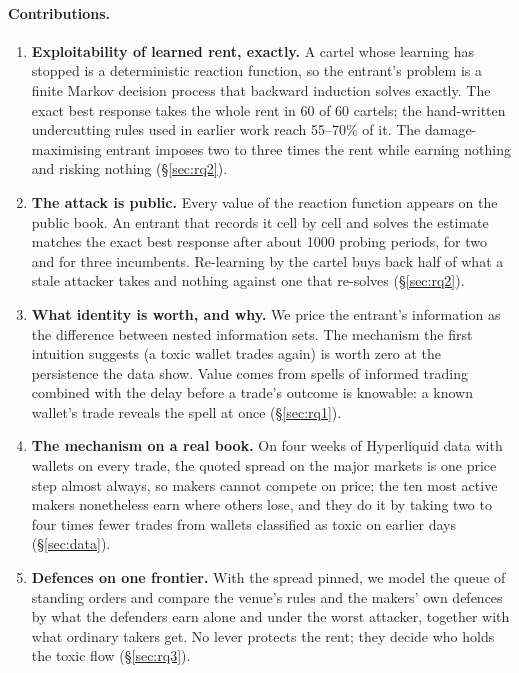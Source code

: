 \documentclass[11pt]{article}
\begin{document}
\paragraph{Contributions.}
\begin{enumerate}
\item \textbf{Exploitability of learned rent, exactly.} A cartel whose learning has stopped is a deterministic reaction function, so the entrant's problem is a finite Markov decision process that backward induction solves exactly. The exact best response takes the whole rent in 60 of 60 cartels; the hand-written undercutting rules used in earlier work reach 55--70\% of it. The damage-maximising entrant imposes two to three times the rent while earning nothing and risking nothing (\S\ref{sec:rq2}).
\item \textbf{The attack is public.} Every value of the reaction function appears on the public book. An entrant that records it cell by cell and solves the estimate matches the exact best response after about 1000 probing periods, for two and for three incumbents. Re-learning by the cartel buys back half of what a stale attacker takes and nothing against one that re-solves (\S\ref{sec:rq2}).
\item \textbf{What identity is worth, and why.} We price the entrant's information as the difference between nested information sets. The mechanism the first intuition suggests (a toxic wallet trades again) is worth zero at the persistence the data show. Value comes from spells of informed trading combined with the delay before a trade's outcome is knowable: a known wallet's trade reveals the spell at once (\S\ref{sec:rq1}).
\item \textbf{The mechanism on a real book.} On four weeks of Hyperliquid data with wallets on every trade, the quoted spread on the major markets is one price step almost always, so makers cannot compete on price; the ten most active makers nonetheless earn where others lose, and they do it by taking two to four times fewer trades from wallets classified as toxic on earlier days (\S\ref{sec:data}).
\item \textbf{Defences on one frontier.} With the spread pinned, we model the queue of standing orders and compare the venue's rules and the makers' own defences by what the defenders earn alone and under the worst attacker, together with what ordinary takers get. No lever protects the rent; they decide who holds the toxic flow (\S\ref{sec:rq3}).
\end{enumerate}
\end{document}
